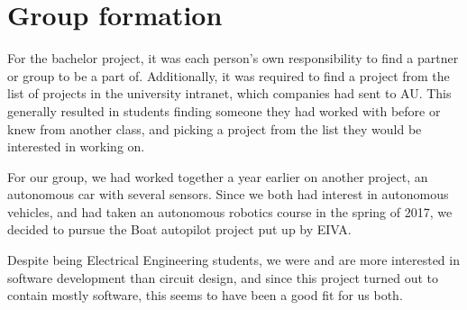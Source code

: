 \chapter{Group formation}
For the bachelor project, it was each person's own responsibility to find a partner or group to be a part of. Additionally, it was required to find a project from the list of projects in the university intranet, which companies had sent to AU. This generally resulted in students finding someone they had worked with before or knew from another class, and picking a project from the list they would be interested in working on. 

For our group, we had worked together a year earlier on another project, an autonomous car with several sensors. Since we both had interest in autonomous vehicles, and had taken an autonomous robotics course in the spring of 2017, we decided to pursue the Boat autopilot project put up by EIVA. 

Despite being Electrical Engineering students, we were and are more interested in software development than circuit design, and since this project turned out to contain mostly software, this seems to have been a good fit for us both.